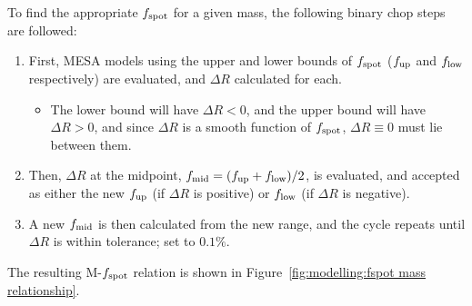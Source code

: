 To find the appropriate $f_{\rm spot}$ for a given mass, the following binary chop steps are followed:
\begin{enumerate}
    \setlength\itemsep{0em}
    \item First, MESA models using the upper and lower bounds of $f_{\rm spot}$ ($f_{\rm up}$ and $f_{\rm low}$ respectively) are evaluated, and $\Delta R$ calculated for each.
    \begin{itemize}
        \item The lower bound will have $\Delta R < 0$, and the upper bound will have $\Delta R > 0$, and since $\Delta R$ is a smooth function of $f_{\rm spot}$, $\Delta R \equiv 0$ must lie between them.
    \end{itemize}
    \item Then, $\Delta R$ at the midpoint, $f_{\rm mid} = (f_{\rm up} + f_{\rm low})/2$, is evaluated, and accepted as either the new $f_{\rm up}$ (if $\Delta R$ is positive) or $f_{\rm low}$ (if $\Delta R$ is negative).
    \item A new $f_{\rm mid}$ is then calculated from the new range, and the cycle repeats until $\Delta R$ is within tolerance; set to $0.1\%$.
\end{enumerate}
The resulting M-$f_{\rm spot}$ relation is shown in Figure~\ref{fig:modelling:fspot mass relationship}.
